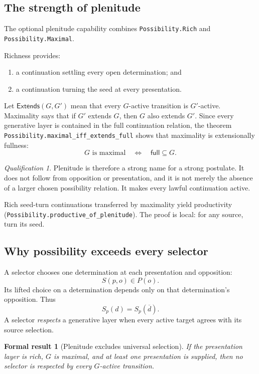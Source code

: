 \documentclass[11pt]{article}
\newtheorem{formalresult}{Formal result}[section]
\theoremstyle{definition}
\theoremstyle{remark}
\newtheorem*{qualification}{Qualification}
\newcommand{\lean}[1]{\nolinkurl{#1}}
\newcommand{\negd}[1]{\overline{#1}}
\begin{document}
\subsection{The strength of plenitude}

The optional plenitude capability combines \lean{Possibility.Rich} and
\lean{Possibility.Maximal}.

Richness provides:
\begin{enumerate}[label=(R\arabic*)]
  \item a continuation settling every open determination; and
  \item a continuation turning the seed at every presentation.
\end{enumerate}

Let \(\mathsf{Extends}(G,G')\) mean that every \(G\)-active transition is
\(G'\)-active. Maximality says that if \(G'\) extends \(G\), then \(G\) also
extends \(G'\). Since every generative layer is contained in the full
continuation relation, the theorem
\lean{Possibility.maximal_iff_extends_full} shows that maximality is
extensionally fullness:
\[
  G\text{ is maximal}
  \quad\Longleftrightarrow\quad
  \mathsf{full}\subseteq G.
\]

\begin{qualification}
Plenitude is therefore a strong name for a strong postulate. It does not
follow from opposition or presentation, and it is not merely the absence of a
larger chosen possibility relation. It makes every lawful continuation active.
\end{qualification}

Rich seed-turn continuations transferred by maximality yield productivity
(\lean{Possibility.productive_of_plenitude}). The proof is local: for any
source, turn its seed.

\subsection{Why possibility exceeds every selector}

A selector chooses one determination at each presentation and opposition:
\[
  S(p,o)\in P(o).
\]
Its lifted choice on a determination depends only on that determination's
opposition. Thus
\[
  S_p(d)=S_p(\negd d).
\]
A selector \emph{respects} a generative layer when every active target agrees
with its source selection.

\begin{formalresult}[Plenitude excludes universal selection]
If the presentation layer is rich, \(G\) is maximal, and at least one
presentation is supplied, then no selector is respected by every
\(G\)-active transition.
\end{formalresult}
\end{document}
